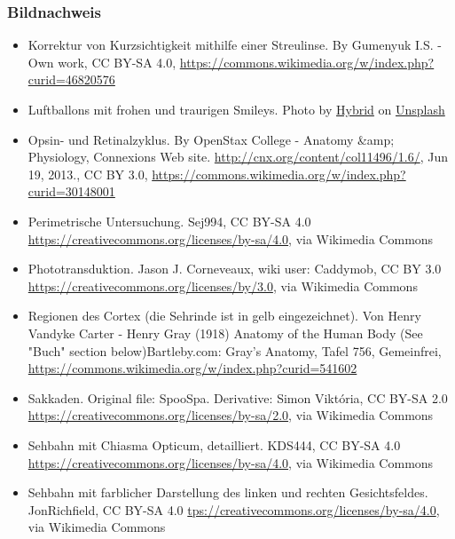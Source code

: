 \documentclass{beamer}
\begin{document}
 
\begin{frame}
\frametitle{Bildnachweis}
\begin{tiny}



 
\begin{itemize}

  
\item
Korrektur von Kurzsichtigkeit mithilfe einer Streulinse. By Gumenyuk I.S. - Own work, CC BY-SA 4.0, \url{https://commons.wikimedia.org/w/index.php?curid=46820576}

\item
Luftballons mit frohen und traurigen Smileys. Photo by \href{https://unsplash.com/@artbyhybrid?utm_source=unsplash&utm_medium=referral&utm_content=creditCopyText}{Hybrid} on \href{https://unsplash.com/s/photos/feedback?utm_source=unsplash&utm_medium=referral&utm_content=creditCopyText}{Unsplash}

\item
Opsin- und Retinalzyklus. By OpenStax College - Anatomy &amp; Physiology, Connexions Web site. \url{http://cnx.org/content/col11496/1.6/}, Jun 19, 2013., CC BY 3.0, \url{https://commons.wikimedia.org/w/index.php?curid=30148001}

\item
Perimetrische Untersuchung. Sej994, CC BY-SA 4.0 \url{https://creativecommons.org/licenses/by-sa/4.0}, via Wikimedia Commons


\item
Phototransduktion. Jason J. Corneveaux, wiki user: Caddymob, CC BY 3.0 \url{https://creativecommons.org/licenses/by/3.0}, via Wikimedia Commons

\item
Regionen des Cortex (die Sehrinde ist in gelb eingezeichnet). Von Henry Vandyke Carter - Henry Gray (1918) Anatomy of the Human Body (See "Buch" section below)Bartleby.com: Gray's Anatomy, Tafel 756, Gemeinfrei, \url{https://commons.wikimedia.org/w/index.php?curid=541602}

\item
Sakkaden. Original file: SpooSpa. Derivative: Simon Viktória, CC BY-SA 2.0 \url{https://creativecommons.org/licenses/by-sa/2.0}, via Wikimedia Commons

\item
Sehbahn mit Chiasma Opticum, detailliert. KDS444, CC BY-SA 4.0 \url{https://creativecommons.org/licenses/by-sa/4.0}, via Wikimedia Commons

\item
Sehbahn mit farblicher Darstellung des linken und rechten Gesichtsfeldes. JonRichfield, CC BY-SA 4.0 \url{tps://creativecommons.org/licenses/by-sa/4.0}, via Wikimedia Commons


\end{itemize}
\end{tiny}
\end{frame}
\end{document}
